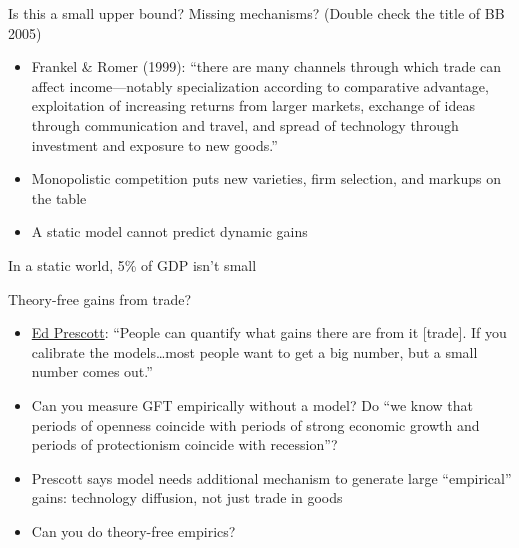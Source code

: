 \documentclass[10pt,notes=hide]{beamer}
\begin{document}
\begin{frame}{Is this a small upper bound?}
Missing mechanisms? (Double check the title of BB 2005)
\begin{itemize}
	\item Frankel \& Romer (1999): ``there are many channels through which trade can affect income—notably specialization according to comparative advantage, exploitation of increasing returns from larger markets, exchange of ideas through communication and travel, and spread of technology through investment and exposure to new goods.''
	\item Monopolistic competition puts new varieties, firm selection, and markups on the table
	\item A static model cannot predict dynamic gains
\end{itemize}
In a static world, 5\% of GDP isn't small
\end{frame}
\begin{frame}{Theory-free gains from trade?}
\begin{itemize}
	\item \href{https://tradediversion.net/2010/09/20/how-big-are-the-gains-from-trade/}{Ed Prescott}: ``People can quantify what gains there are from it [trade]. If you calibrate the models\dots most people want to get a big number, but a small number comes out.''
	\item Can you measure GFT empirically without a model? Do ``we know that periods of openness coincide with periods of strong economic growth and periods of protectionism coincide with recession''?
	\item Prescott says model needs additional mechanism to generate large ``empirical'' gains: technology diffusion, not just trade in goods
	\item Can you do theory-free empirics?
\end{itemize}
\end{frame}
\end{document}
